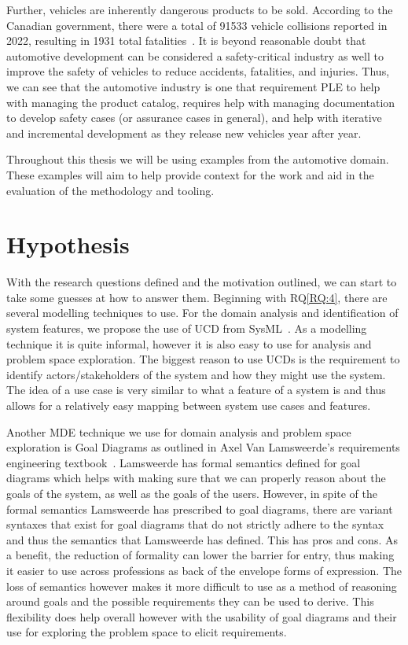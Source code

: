 Further, vehicles are inherently dangerous products to be sold. According to the Canadian government, there were a total of 91533 vehicle collisions reported in 2022, resulting in 1931 total fatalities~\cite{CanadaCrashStats}. It is beyond reasonable doubt that automotive development can be considered a safety-critical industry as well to improve the safety of vehicles to reduce accidents, fatalities, and injuries. Thus, we can see that the automotive industry is one that requirement \ac{PLE} to help with managing the product catalog, requires help with managing documentation to develop safety cases (or assurance cases in general), and help with iterative and incremental development as they release new vehicles year after year.

Throughout this thesis we will be using examples from the automotive domain. These examples will aim to help provide context for the work and aid in the evaluation of the methodology and tooling.

\section{Hypothesis}

With the research questions defined and the motivation outlined, we can start to take some guesses at how to answer them. Beginning with RQ\ref{RQ:4}, there are several modelling techniques to use. For the domain analysis and identification of system features, we propose the use of \ac{UCD} from SysML~\cite{sysml2019omg}. As a modelling technique it is quite informal, however it is also easy to use for analysis and problem space exploration. The biggest reason to use \ac{UCD}s is the requirement to identify actors/stakeholders of the system and how they might use the system. The idea of a use case is very similar to what a feature of a system is and thus allows for a relatively easy mapping between system use cases and features.

Another \ac{MDE} technique we use for domain analysis and problem space exploration is Goal Diagrams as outlined in Axel Van Lamsweerde's requirements engineering textbook~\cite{lamsweerde2009requirements}. Lamsweerde has formal semantics defined for goal diagrams which helps with making sure that we can properly reason about the goals of the system, as well as the goals of the users. However, in spite of the formal semantics Lamsweerde has prescribed to goal diagrams, there are variant syntaxes that exist for goal diagrams that do not strictly adhere to the syntax and thus the semantics that Lamsweerde has defined. This has pros and cons. As a benefit, the reduction of formality can lower the barrier for entry, thus making it easier to use across professions as back of the envelope forms of expression. The loss of semantics however makes it more difficult to use as a method of reasoning around goals and the possible requirements they can be used to derive. This flexibility does help overall however with the usability of goal diagrams and their use for exploring the problem space to elicit requirements.

